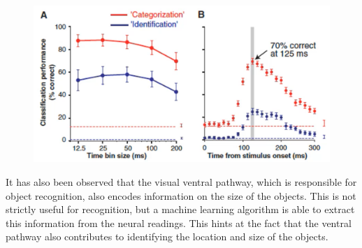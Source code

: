 \begin{casestudy}
    \begin{figure}[H]
        \centering
        \includegraphics[width=0.5\linewidth]{./img/monkey_svm_time.png}
    \end{figure}

    It has also been observed that the visual ventral pathway, which is responsible for object recognition, also encodes information on the size of the objects.
    This is not strictly useful for recognition, but a machine learning algorithm is able to extract this information from the neural readings.
    This hints at the fact that the ventral pathway also contributes to identifying the location and size of the objects.
\end{casestudy}


